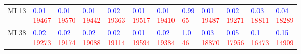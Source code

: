 \begin{tabular}{llllllllllll}
MI 13  &  \makecell{\textcolor{blue}{0.01} \\ \textcolor{red}{19467}} &  \makecell{\textcolor{blue}{0.01} \\ \textcolor{red}{19570}} &  \makecell{\textcolor{blue}{0.01} \\ \textcolor{red}{19442}} &  \makecell{\textcolor{blue}{0.02} \\ \textcolor{red}{19363}} &  \makecell{\textcolor{blue}{0.01} \\ \textcolor{red}{19517}} &  \makecell{\textcolor{blue}{0.01} \\ \textcolor{red}{19410}} &   \makecell{\textcolor{blue}{0.99} \\ \textcolor{red}{65}} &  \makecell{\textcolor{blue}{0.01} \\ \textcolor{red}{19487}} &  \makecell{\textcolor{blue}{0.02} \\ \textcolor{red}{19271}} &  \makecell{\textcolor{blue}{0.03} \\ \textcolor{red}{18811}} &  \makecell{\textcolor{blue}{0.04} \\ \textcolor{red}{18289}} \\
MI 38  &  \makecell{\textcolor{blue}{0.02} \\ \textcolor{red}{19273}} &  \makecell{\textcolor{blue}{0.02} \\ \textcolor{red}{19174}} &  \makecell{\textcolor{blue}{0.02} \\ \textcolor{red}{19088}} &  \makecell{\textcolor{blue}{0.02} \\ \textcolor{red}{19114}} &  \makecell{\textcolor{blue}{0.01} \\ \textcolor{red}{19594}} &  \makecell{\textcolor{blue}{0.02} \\ \textcolor{red}{19384}} &    \makecell{\textcolor{blue}{1.0} \\ \textcolor{red}{46}} &  \makecell{\textcolor{blue}{0.03} \\ \textcolor{red}{18870}} &  \makecell{\textcolor{blue}{0.05} \\ \textcolor{red}{17956}} &   \makecell{\textcolor{blue}{0.1} \\ \textcolor{red}{16473}} &  \makecell{\textcolor{blue}{0.15} \\ \textcolor{red}{14909}} \\

\end{tabular}
